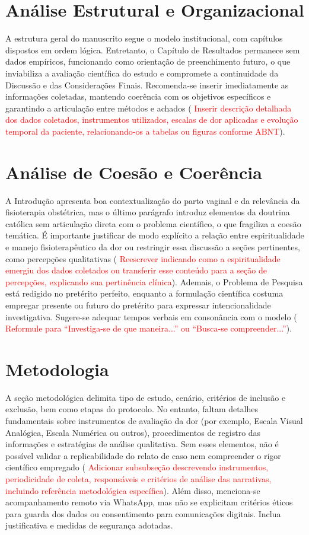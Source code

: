 \section*{Análise Estrutural e Organizacional}
A estrutura geral do manuscrito segue o modelo institucional, com capítulos dispostos em ordem lógica. Entretanto, o Capítulo de Resultados permanece sem dados empíricos, funcionando como orientação de preenchimento futuro, o que inviabiliza a avaliação científica do estudo e compromete a continuidade da Discussão e das Considerações Finais. Recomenda-se inserir imediatamente as informações coletadas, mantendo coerência com os objetivos específicos e garantindo a articulação entre métodos e achados (
\textcolor{red}{Inserir descrição detalhada dos dados coletados, instrumentos utilizados, escalas de dor aplicadas e evolução temporal da paciente, relacionando-os a tabelas ou figuras conforme ABNT}).

\section*{Análise de Coesão e Coerência}
A Introdução apresenta boa contextualização do parto vaginal e da relevância da fisioterapia obstétrica, mas o último parágrafo introduz elementos da doutrina católica sem articulação direta com o problema científico, o que fragiliza a coesão temática. É importante justificar de modo explícito a relação entre espiritualidade e manejo fisioterapêutico da dor ou restringir essa discussão a seções pertinentes, como percepções qualitativas (
\textcolor{red}{Reescrever indicando como a espiritualidade emergiu dos dados coletados ou transferir esse conteúdo para a seção de percepções, explicando sua pertinência clínica}). Ademais, o Problema de Pesquisa está redigido no pretérito perfeito, enquanto a formulação científica costuma empregar presente ou futuro do pretérito para expressar intencionalidade investigativa. Sugere-se adequar tempos verbais em consonância com o modelo (
\textcolor{red}{Reformule para “Investiga-se de que maneira...” ou “Busca-se compreender...”}).

\section*{Metodologia}
A seção metodológica delimita tipo de estudo, cenário, critérios de inclusão e exclusão, bem como etapas do protocolo. No entanto, faltam detalhes fundamentais sobre instrumentos de avaliação da dor (por exemplo, Escala Visual Analógica, Escala Numérica ou outros), procedimentos de registro das informações e estratégias de análise qualitativa. Sem esses elementos, não é possível validar a replicabilidade do relato de caso nem compreender o rigor científico empregado (
\textcolor{red}{Adicionar subsubseção descrevendo instrumentos, periodicidade de coleta, responsáveis e critérios de análise das narrativas, incluindo referência metodológica específica}). Além disso, menciona-se acompanhamento remoto via WhatsApp, mas não se explicitam critérios éticos para guarda dos dados ou consentimento para comunicações digitais. Inclua justificativa e medidas de segurança adotadas.

